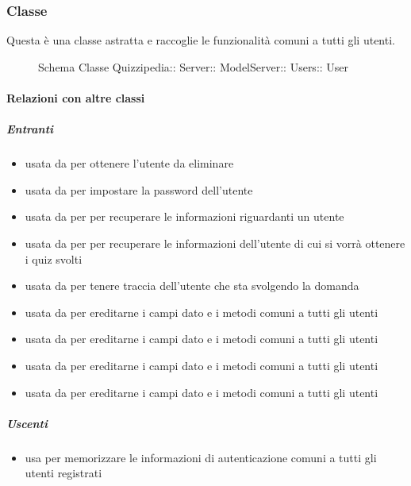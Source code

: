 \subsubsection{Classe }
Questa è una classe astratta e raccoglie le funzionalità comuni a tutti gli utenti.
\begin{figure}[H]
\centering
\noindent{}
\caption[Schema Classe User]{Schema Classe Quizzipedia:: Server:: ModelServer:: Users:: User}
\end{figure}
\paragraph{Relazioni con altre classi}
\subparagraph{Entranti}
\begin{itemize}
\item usata da  per ottenere l'utente da eliminare
\item usata da  per impostare la password dell'utente
\item usata da  per per recuperare le informazioni riguardanti un utente
\item usata da  per per recuperare le informazioni dell'utente di cui si vorrà ottenere i quiz svolti
\item usata da  per tenere traccia dell'utente che sta svolgendo la domanda
\item usata da  per ereditarne i campi dato e i metodi comuni a tutti gli utenti
\item usata da  per ereditarne i campi dato e i metodi comuni a tutti gli utenti
\item usata da  per ereditarne i campi dato e i metodi comuni a tutti gli utenti
\item usata da  per ereditarne i campi dato e i metodi comuni a tutti gli utenti
\end{itemize}
\subparagraph{Uscenti}
\begin{itemize}
\item usa  per memorizzare le informazioni di autenticazione comuni a tutti gli utenti registrati
\end{itemize}

